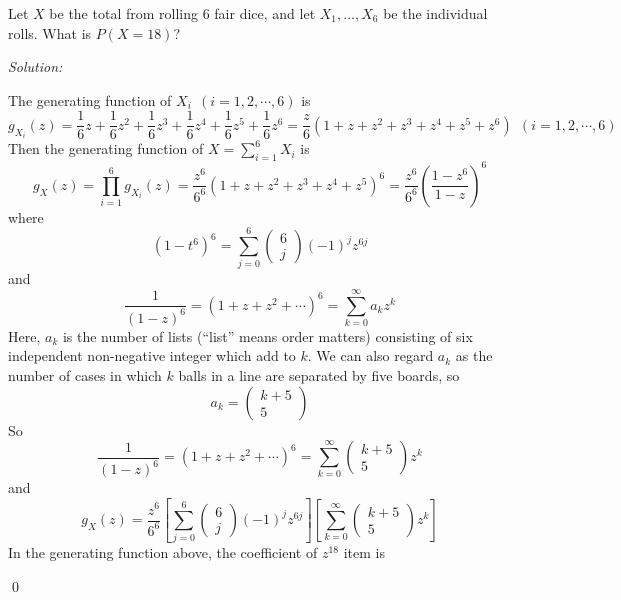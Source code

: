 \documentclass[12pt]{article}
\newenvironment{problem}[2][Problem]{\begin{trivlist}
\item[\hskip \labelsep {\bfseries #1}\hskip \labelsep {\bfseries #2.}]}{\end{trivlist}}
\newenvironment{sol}
    {\emph{Solution:}
    }
    {
    \qed
    }
\begin{document}




\begin{problem}{1}
Let $X$ be the total from rolling 6 fair dice, and let $X_1,...,X_6$ be the individual rolls. What is $P(X=18)$?
\end{problem}
\begin{sol}
The generating function of $X_i~~(i=1,2,\cdots,6)$ is
\[
g_{X_i}(z)=\frac{1}{6}z+\frac{1}{6}z^2+\frac{1}{6}z^3+\frac{1}{6}z^4+\frac{1}{6}z^5+\frac{1}{6}z^6=\frac{z}{6}(1+z+z^2+z^3+z^4+z^5+z^6)~~(i=1,2,\cdots,6)
\]
Then the generating function of $X=\sum_{i=1}^{6}X_i$ is
\[
g_X(z)=\prod_{i=1}^6g_{X_i}(z)=\frac{z^6}{6^6}(1+z+z^2+z^3+z^4+z^5)^6=\frac{z^6}{6^6}(\frac{1-z^6}{1-z})^6
\]
where
\[
(1-t^6)^6=\sum_{j=0}^6\left(\begin{array}{c}6\\j\end{array}\right)(-1)^jz^{6j}
\]
and
\[
\frac{1}{(1-z)^6}=(1+z+z^2+\cdots)^6=\sum_{k=0}^{\infty}a_kz^k
\]
Here, $a_k$ is the number of lists (``list'' means order matters) consisting of six independent non-negative integer which add to $k$. We can also regard $a_k$ as the number of cases in which $k$ balls in a line are separated by five boards, so
\[
a_k=\left(\begin{array}{c}k+5\\5\end{array}\right)
\]
So
\[
\frac{1}{(1-z)^6}=(1+z+z^2+\cdots)^6=\sum_{k=0}^{\infty}\left(\begin{array}{c}k+5\\5\end{array}\right)z^k
\]
and
\[
g_X(z)=\frac{z^6}{6^6}\left[\sum_{j=0}^6\left(\begin{array}{c}6\\j\end{array}\right)(-1)^jz^{6j}\right]\left[\sum_{k=0}^{\infty}\left(\begin{array}{c}k+5\\5\end{array}\right)z^k\right]
\]
In the generating function above, the coefficient of $z^{18}$ item is
\[
\]
\end{sol}
\end{document}
